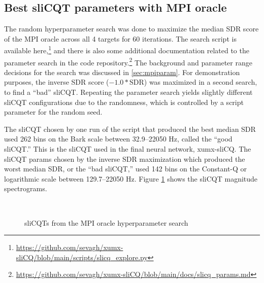 \documentclass[report.tex]{subfiles}
\begin{document}
\newpagefill

\subsection{Best sliCQT parameters with MPI oracle}

The random hyperparameter search was done to maximize the median SDR score of the MPI oracle across all 4 targets for 60 iterations. The search script is available here,\footnote{\url{https://github.com/sevagh/xumx-sliCQ/blob/main/scripts/slicq_explore.py}} and there is also some additional documentation related to the parameter search in the code repository.\footnote{\url{https://github.com/sevagh/xumx-sliCQ/blob/main/docs/slicq_params.md}} The background and parameter range decisions for the search was discussed in \ref{sec:mpiparam}. For demonstration purposes, the inverse SDR score ($-1.0*\text{SDR}$) was maximized in a second search, to find a ``bad'' sliCQT. Repeating the parameter search yields slightly different sliCQT configurations due to the randomness, which is controlled by a script parameter for the random seed.

The sliCQT chosen by one run of the script that produced the best median SDR used 262 bins on the Bark scale between 32.9--22050 Hz, called the ``good sliCQT.'' This is the sliCQT used in the final neural network, xumx-sliCQ. The sliCQT params chosen by the inverse SDR maximization which produced the worst median SDR, or the ``bad sliCQT,'' used 142 bins on the Constant-Q or logarithmic scale between 129.7--22050 Hz. Figure \ref{fig:bipolarslicqs} shows the sliCQT magnitude spectrograms.

\begin{figure}[ht]
	\centering
	\\
	\caption{sliCQTs from the MPI oracle hyperparameter search}
	\label{fig:bipolarslicqs}
\end{figure}
\end{document}
